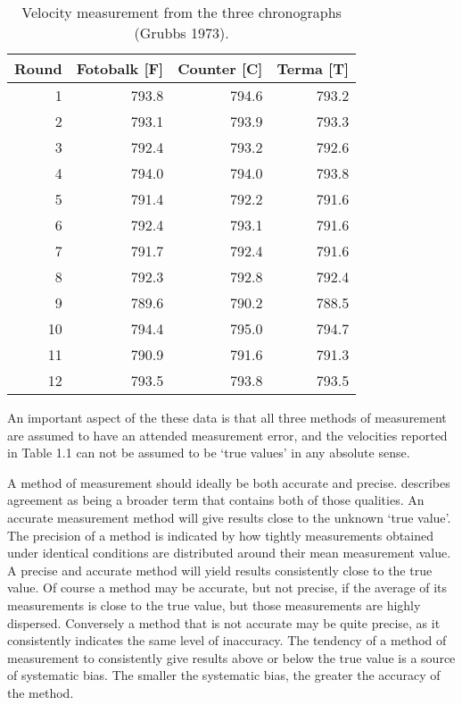 \documentclass[12pt, a4paper]{report}
\theoremstyle{plain}
\theoremstyle{definition}
\theoremstyle{remark}
\begin{document}
	\begin{table}[ht]
		\begin{center}
			\begin{tabular}{rrrr}
				\hline
				Round& Fotobalk [F] & Counter [C]& Terma [T]\\
				\hline
				1 & 793.8 & 794.6 & 793.2 \\
				2 & 793.1 & 793.9 & 793.3 \\
				3 & 792.4 & 793.2 & 792.6 \\
				4 & 794.0 & 794.0 & 793.8 \\
				5 & 791.4 & 792.2 & 791.6 \\
				6 & 792.4 & 793.1 & 791.6 \\
				7 & 791.7 & 792.4 & 791.6 \\
				8 & 792.3 & 792.8 & 792.4 \\
				9 & 789.6 & 790.2 & 788.5 \\
				10 & 794.4 & 795.0 & 794.7 \\
				11 & 790.9 & 791.6 & 791.3 \\
				12 & 793.5 & 793.8 & 793.5 \\
				\hline
			\end{tabular}
			\caption{Velocity measurement from the three chronographs (Grubbs
				1973).}
		\end{center}
		\label{FCTdata}
	\end{table}
	
	An important aspect of the these data is that all three methods of
	measurement are assumed to have an attended measurement error, and
	the velocities reported in Table 1.1 can not be assumed to be
	`true values' in any absolute sense.
	
	
	A method of measurement should ideally be both accurate and
	precise. \citet{Barnhart} describes agreement as being a broader
	term that contains both of those qualities. An accurate
	measurement method will give results close to the unknown `true
	value'. The precision of a method is indicated by how tightly
	measurements obtained under identical conditions are distributed
	around their mean measurement value. A precise and accurate method
	will yield results consistently close to the true value. Of course
	a method may be accurate, but not precise, if the average of its
	measurements is close to the true value, but those measurements
	are highly dispersed. Conversely a method that is not accurate may
	be quite precise, as it consistently indicates the same level of
	inaccuracy. The tendency of a method of measurement to
	consistently give results above or below the true value is a
	source of systematic bias. The smaller the systematic bias, the
	greater the accuracy of the method.
	
\end{document}
